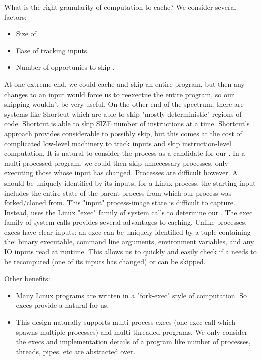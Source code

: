 What is the right granularity of computation to cache? We consider several factors:

\begin{itemize}
  \item Size of \cacheunit
  \item Ease of tracking \cacheunit{} inputs.
  \item Number of opportunies to skip \cacheunit{}.
\end{itemize}

At one extreme end, we could cache and skip an entire program, but then any changes to an input would force us to reexectue the entire program, so our skipping wouldn't be very useful. On the other end of the spectrum, there are systems like Shortcut \cite{shortcut} which are able to skip "mostly-deterministic" regions of code. Shortcut is able to skip SIZE number of instructions at a time. Shortcut's approach provides considerable \cacheunit{} to possibly skip, but this comes at the cost of complicated low-level machinery to track inputs and skip instruction-level computation.
It is natural to consider the process as a candidate for our \cacheunit. In a multi-processed program,
  we could then skip unnecessary processes, only executing those whose input has changed. Processes are difficult
  however. A \cacheunit{} should be uniquely identified by its inputs, for a Linux process, the starting input
  includes the entire state of the parent process from which our process was forked/cloned from. This "input" process-image state is difficult to capture. 
Instead, \pc uses the Linux "exec" family of system calls to determine our \cacheunit. The exec family of system calls provides several advantages to caching. Unlike processes, execs have clear inputs: an exec can
be uniquely identified by a tuple containing the: binary executable, command line arguments, environment variables, and any IO inputs read at runtime. This allows us to quickly and easily check if a \cacheunit{} needs
to be recomputed (one of its inputs has changed) or can be skipped.

Other benefits:
\begin{itemize}
  \item Many Linux programs are written in a "fork-exec" style of computation. So execs provide a natural
  \cacheunit{} for us.
  \item This design naturally supports multi-process execs (one exec call which spawns multiple processes) and multi-threaded programs. We only consider the execs and implementation details of a program like number of processes, threads, pipes, etc are abstracted over.
\end{itemize}

